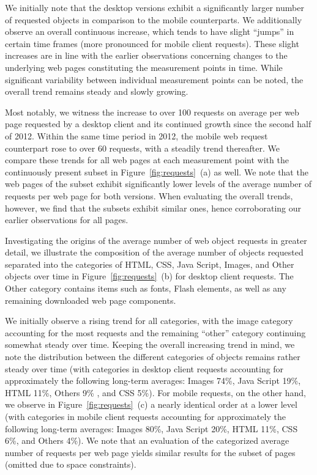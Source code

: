 \documentclass[journal,final]{IEEEtran}
\begin{document}
We initially note that the desktop versions exhibit a significantly larger number of requested objects in comparison to the mobile counterparts.
We additionally observe an overall continuous increase, which tends to have slight ``jumps'' in certain time frames (more pronounced for mobile client requests). 
These slight increases are in line with the earlier observations concerning changes to the underlying web pages constituting the measurement points in time. While significant variability between individual measurement points can be noted,  the overall trend remains steady and slowly growing.


Most notably, we witness the increase to over 100 requests on average per web page requested by a desktop client and its continued growth since the second half of 2012.
Within the same time period in 2012, the mobile web request counterpart rose to over 60 requests, with a steadily trend thereafter. 
We compare these trends for all web pages at each measurement point with the continuously present subset in Figure~\ref{fig:requests}~(a) as well.
We note that the web pages of the subset exhibit significantly lower levels of the average number of requests per web page for both versions. 
When evaluating the overall trends, however, we find that the subsets exhibit similar ones, hence corroborating our earlier observations for all pages.

Investigating the origins of the average number of web object requests in greater detail, we illustrate the composition of the average number of objects requested separated into the categories of HTML, CSS, Java Script, Images, and Other objects over time in Figure~\ref{fig:requests}~(b) for desktop client requests.
The Other category contains items such as fonts, Flash elements, as well as any remaining downloaded web page components.

We initially observe a rising trend for all categories, with the image category accounting for the most requests and the remaining ``other'' category continuing somewhat steady over time.
Keeping the overall increasing trend in mind, we note the distribution between the different categories of objects remains rather steady over time (with categories in desktop client requests accounting for approximately the following long-term averages: Images 74\%, Java Script 19\%, HTML 11\%, Others 9\% , and CSS 5\%).
For mobile requests, on the other hand, we observe in Figure~\ref{fig:requests}~(c) a nearly identical order at a lower level (with categories in mobile client requests accounting for approximately the following long-term averages: Images 80\%, Java Script 20\%, HTML 11\%, CSS 6\%, and Others 4\%).
We note that an evaluation of the categorized average number of requests per web page yields similar results for the subset of pages (omitted due to space constraints).
\end{document}
